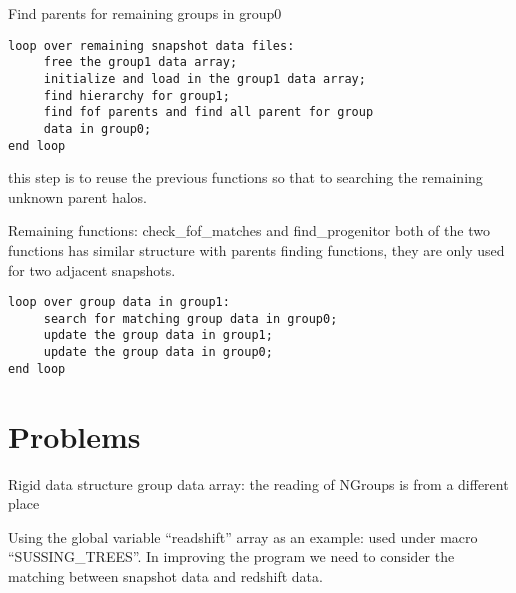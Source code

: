 \documentclass[notheorems, aspectratio=54]{beamer}
\begin{document}
\begin{frame}[fragile]

\begin{block}{Find parents for remaining groups in group0}
 \begin{verbatim}
loop over remaining snapshot data files:
     free the group1 data array;
     initialize and load in the group1 data array;
     find hierarchy for group1;
     find fof parents and find all parent for group 
     data in group0;
end loop
 \end{verbatim}
\end{block}
this step is to reuse the previous functions so that to searching the remaining unknown parent halos.

\end{frame}

\begin{frame}[fragile]

\begin{block}{Remaining functions: check\_fof\_matches and find\_progenitor}
both of the two functions has similar structure with parents finding functions, they are only used
for two adjacent snapshots.
 \begin{verbatim}
loop over group data in group1:
     search for matching group data in group0;
     update the group data in group1;
     update the group data in group0;
end loop
 \end{verbatim}
\end{block}

\end{frame}

\section{Problems}
\begin{frame}

\begin{block}{Rigid data structure} 
group data array: the reading of NGroups is from a different place 
 \end{block}


 \begin{block}{Using the global variable} 
  ``readshift'' array as an example:  used under macro ``SUSSING\_TREES''. In improving the program we need to consider
  the matching between snapshot data and redshift data.
 \end{block}


\end{frame}
\end{document}
